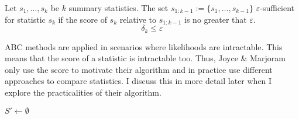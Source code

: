 \documentclass[bibliography=totoc,11pt,a4paper,margin=0]{article}
\theoremstyle{break}
\begin{document}
  \begin{box_definition}\label{def_approximate_suffiency}
    Let $s_1,\dots,s_k$ be $k$ summary statistics. The set $s_{1:k-1}:=\{s_1,\dots,s_{k-1}\}$ $\varepsilon$-sufficient for statistic $s_k$ if the score of $s_k$ relative to $s_{1:k-1}$ is no greater that $\varepsilon$.
    \[ \delta_k\leq\varepsilon \]
  \end{box_definition}

  \par ABC methods are applied in scenarios where likelihoods are intractable. This means that the score of a statistic is intractable too. Thus, Joyce \& Marjoram only use the score to motivate their algorithm and in practice use different approaches to compare statistics. I discuss this in more detail later when I explore the practicalities of their algorithm. %

  \begin{box_algorithm}\label{alg_approximately_sufficient_subsets}
    \begin{algorithm}[H]
      $S'\leftarrow\emptyset$\\
    \end{algorithm}
  \end{box_algorithm}
\end{document}
